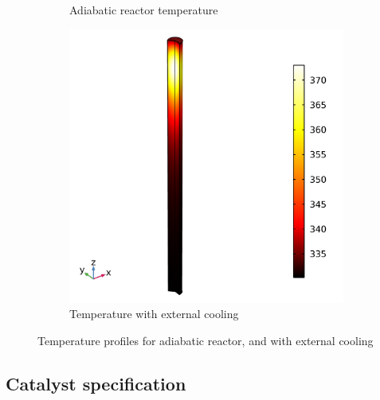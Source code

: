 \begin{figure}[h]
    \centering
    
    \begin{subfigure}{0.32\linewidth}
        \label{fig:Adiabatic-without-cooling}
        \caption{Adiabatic reactor temperature}
    \end{subfigure}
    \begin{subfigure}{0.32\linewidth}
        \includegraphics[width=\linewidth]{figures/simple-tube-temperature.png}
        \caption{Temperature with external cooling}
    \end{subfigure}


    \caption{Temperature profiles for adiabatic reactor, and with external cooling}
    \label{fig:simple-tube}
\end{figure}

\subsection{Catalyst specification}
